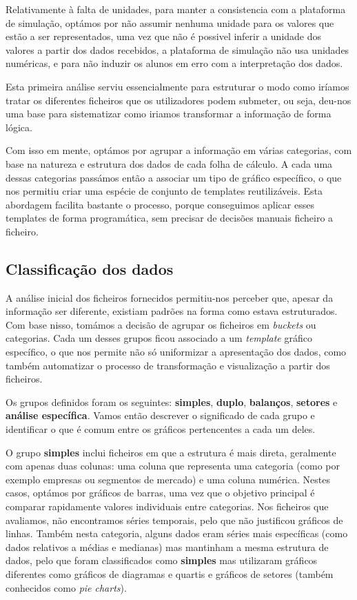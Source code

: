 Relativamente à falta de unidades, para manter a consistencia com a plataforma de simulação, optámos por não assumir nenhuma unidade para os valores que estão a ser representados, uma vez que não é possivel inferir a unidade dos valores a partir dos dados recebidos, a plataforma de simulação não usa unidades numéricas, e para não induzir os alunos em erro com a interpretação dos dados.

Esta primeira análise serviu essencialmente para estruturar o modo como iríamos tratar os diferentes ficheiros que os utilizadores podem submeter, ou seja, deu-nos uma base para sistematizar como iriamos transformar a informação de forma lógica.

Com isso em mente, optámos por agrupar a informação em várias categorias, com base na natureza e estrutura dos dados de cada folha de cálculo. A cada uma dessas categorias passámos então a associar um tipo de gráfico específico, o que nos permitiu criar uma espécie de conjunto de templates reutilizáveis. Esta abordagem facilita bastante o processo, porque conseguimos aplicar esses templates de forma programática, sem precisar de decisões manuais ficheiro a ficheiro.

\subsection{Classificação dos dados}

A análise inicial dos ficheiros fornecidos permitiu-nos perceber que, apesar da informação ser diferente,  existiam padrões na forma como estava estruturados. Com base nisso, tomámos a decisão de agrupar os ficheiros em \textit{buckets} ou categorias. Cada um desses grupos ficou associado a um \textit{template} gráfico específico, o que nos permite não só uniformizar a apresentação dos dados, como também automatizar o processo de transformação e visualização a partir dos ficheiros.

Os grupos definidos foram os seguintes: \textbf{simples}, \textbf{duplo}, \textbf{balanços}, \textbf{setores} e \textbf{análise específica}. Vamos então descrever o significado de cada grupo e identificar o que é comum entre os gráficos pertencentes a cada um deles.

O grupo \textbf{simples} inclui ficheiros em que a estrutura é mais direta, geralmente com apenas duas colunas: uma coluna que representa uma categoria (como por exemplo empresas ou segmentos de mercado) e uma coluna numérica. Nestes casos, optámos por gráficos de barras, uma vez que o objetivo principal é comparar rapidamente valores individuais entre categorias. Nos ficheiros que avaliamos, não encontramos séries temporais, pelo que não justificou gráficos de linhas. Também nesta categoria, alguns dados eram séries mais específicas (como dados relativos a médias e medianas) mas mantinham a mesma estrutura de dados, pelo que foram classificados como \textbf{simples} mas utilizaram gráficos diferentes como gráficos de diagramas e quartis e gráficos de setores (também conhecidos como \textit{pie charts}).

